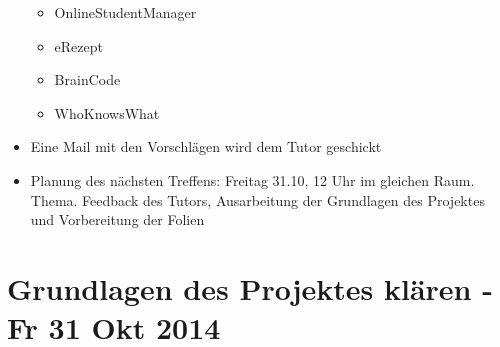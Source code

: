 \begin{itemize}
  \begin{itemize}
  \itemsep1pt\parskip0pt
  \item
    OnlineStudentManager
  \item
    eRezept
  \item
    BrainCode
  \item
    WhoKnowsWhat
  \end{itemize}
\item
  Eine Mail mit den Vorschlägen wird dem Tutor geschickt
\item
  Planung des nächsten Treffens: Freitag 31.10, 12 Uhr im gleichen Raum.
  Thema. Feedback des Tutors, Ausarbeitung der Grundlagen des Projektes
  und Vorbereitung der Folien
\end{itemize}

\section{Grundlagen des Projektes klären - Fr 31 Okt
2014}\label{grundlagen-des-projektes-kluxe4ren---fr-31-okt-2014}

